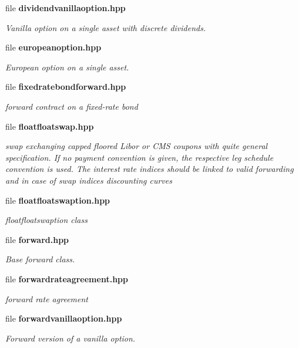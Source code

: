\begin{DoxyCompactItemize}
file {\bf dividendvanillaoption.\+hpp}
\begin{DoxyCompactList}\small\item\em Vanilla option on a single asset with discrete dividends. \end{DoxyCompactList}\item 
file {\bf europeanoption.\+hpp}
\begin{DoxyCompactList}\small\item\em European option on a single asset. \end{DoxyCompactList}\item 
file {\bf fixedratebondforward.\+hpp}
\begin{DoxyCompactList}\small\item\em forward contract on a fixed-\/rate bond \end{DoxyCompactList}\item 
file {\bf floatfloatswap.\+hpp}
\begin{DoxyCompactList}\small\item\em swap exchanging capped floored Libor or C\+MS coupons with quite general specification. If no payment convention is given, the respective leg schedule convention is used. The interest rate indices should be linked to valid forwarding and in case of swap indices discounting curves \end{DoxyCompactList}\item 
file {\bf floatfloatswaption.\+hpp}
\begin{DoxyCompactList}\small\item\em floatfloatswaption class \end{DoxyCompactList}\item 
file {\bf forward.\+hpp}
\begin{DoxyCompactList}\small\item\em Base forward class. \end{DoxyCompactList}\item 
file {\bf forwardrateagreement.\+hpp}
\begin{DoxyCompactList}\small\item\em forward rate agreement \end{DoxyCompactList}\item 
file {\bf forwardvanillaoption.\+hpp}
\begin{DoxyCompactList}\small\item\em Forward version of a vanilla option. \end{DoxyCompactList}\item 

\end{DoxyCompactItemize}
